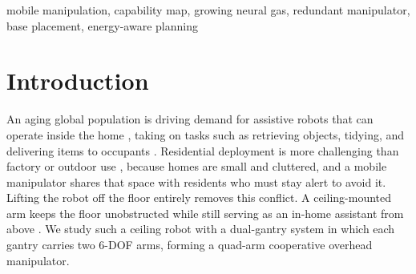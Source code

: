 \documentclass[conference]{IEEEtran}
\begin{document}
\begin{abstract}
The two ceiling-mounted rails carrying four arms turn every pick into two
coupled decisions, which arm should act and where its base should go, since
repositioning the base is a dominant cost of the motion. We propose an
energy-aware selection cost $J$ that chooses the arm and the full
eight-degree-of-freedom (8-DOF) configuration together over a base-aware
capability map built with Growing Neural Gas (GNG). Every node stores a
representative configuration, rail placement included, and its manipulability, so
it already fixes both an arm and a base rather than marking only whether a cell is
reachable. Treating the rail as a degree of freedom when building the map enlarges
the measured reachable workspace by about four times, and boundary-seeding keeps
the map accurate to within about a centimetre of the true reach surface. In
simulation on NVIDIA Isaac Sim, energy-aware selection is evaluated against
nearest, fixed, and random baselines under a rail dynamics model with assumed
Coulomb/viscous friction (a modelling assumption, not measured hardware data), so
repositioning the rail carries a real energy cost. Over a 60-position grid, the
multi-arm policies each reach 93.3\% plan success versus 63--65\% for any single
fixed arm, and energy-aware selection attains the lowest mean measured mechanical
energy of the three (5.1\% below nearest, 3.1\% below random), with a majority
(57--61\%) same-target pairwise win rate against each baseline. 
\end{abstract}

\begin{IEEEkeywords}
mobile manipulation, capability map, growing neural gas, redundant manipulator,
base placement, energy-aware planning
\end{IEEEkeywords}

\section{Introduction}

An aging global population is driving demand for assistive robots that
can operate inside the home \cite{unitednations2024world}, taking on
tasks such as retrieving objects, tidying, and delivering items to occupants
\cite{Lisondra2026}. Residential deployment is more challenging than factory or outdoor
use \cite{kemp2007challenges}, because homes are small and cluttered, and a mobile
manipulator shares that space with residents who must stay alert to avoid it.
Lifting the robot off the floor entirely \cite{Lalonde2025}
removes this conflict. A ceiling-mounted arm keeps the floor unobstructed while still
serving as an in-home assistant from above \cite{Kaluarachchi2025}. We study such a
ceiling robot with a dual-gantry system in which each gantry carries two 6-DOF arms,
forming a quad-arm cooperative overhead manipulator.
\end{document}
